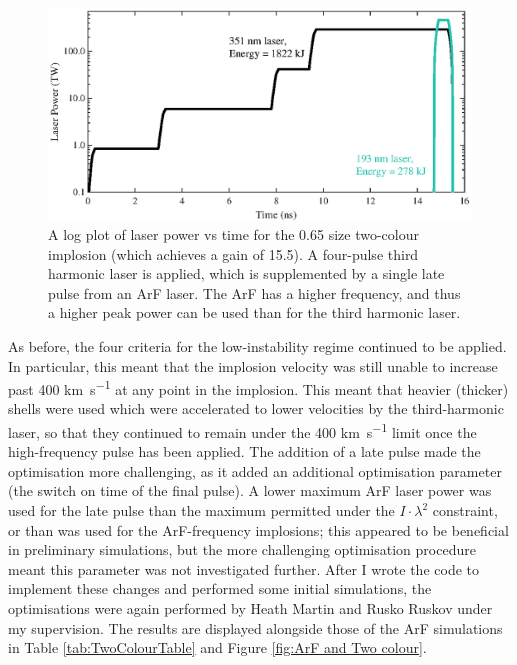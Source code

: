 \begin{figure}[ht]
\centering
\includegraphics{figures/FurtherSims/TwoColourLaser.eps}
\caption{A log plot of laser power vs time for the 0.65 size two-colour implosion (which achieves a gain of 15.5). A four-pulse third harmonic laser is applied, which is supplemented by a single late pulse from an ArF laser. The ArF has a higher frequency, and thus a higher peak power can be used than for the third harmonic laser.}
\label{fig:Two colour sequence}
\end{figure}

As before, the four criteria for the low-instability regime continued to be applied. In particular, this meant that the implosion velocity was still unable to increase past 400 \unit{\kilo\meter\per\second} at any point in the implosion. This meant that heavier (thicker) shells were used which were accelerated to lower velocities by the third-harmonic laser, so that they continued to remain under the 400 \unit{\kilo\meter\per\second} limit once the high-frequency pulse has been applied. The addition of a late pulse made the optimisation more challenging, as it added an additional optimisation parameter (the switch on time of the final pulse). A lower maximum ArF laser power was used for the late pulse than the maximum permitted under the $I \cdot \lambda^2$ constraint, or than was used for the ArF-frequency implosions; this appeared to be beneficial in preliminary simulations, but the more challenging optimisation procedure meant this parameter was not investigated further. After I wrote the code to implement these changes and performed some initial simulations, the optimisations were again performed by Heath Martin and Rusko Ruskov under my supervision. The results are displayed alongside those of the ArF simulations in Table \ref{tab:TwoColourTable} and Figure \ref{fig:ArF and Two colour}.

